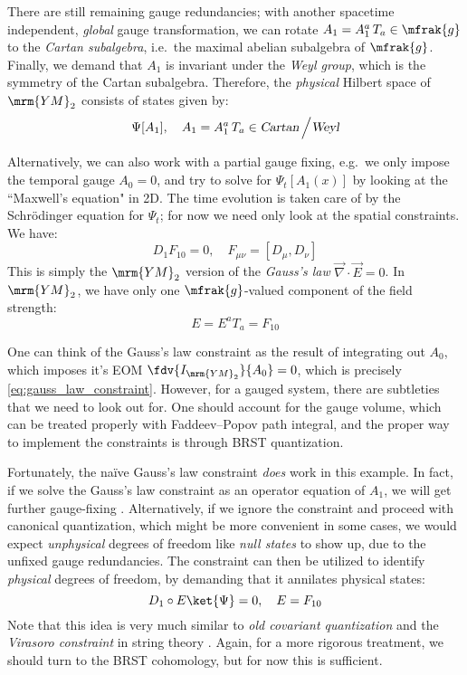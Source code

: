 \documentclass[a4paper
	,10pt
]{article}
\newcommand{\YM}{{\ensuremath{\mrm{YM}_2}}\xspace}
\begin{document}
	There are still remaining gauge redundancies; with another spacetime independent, \textit{global} gauge transformation, we can rotate $
		A_1 = A_1^a\,T_a \in \mfrak{g}
	$ to the \textit{Cartan subalgebra}, i.e.~the maximal abelian subalgebra of $\mfrak{g}$. Finally, we demand that $A_1$ is invariant under the \textit{Weyl group}, which is the symmetry of the Cartan subalgebra. Therefore, the \textit{physical} Hilbert space of \YM consists of states given by:
	\begin{equation}
		\Psi[A_1],\quad
		A_1
		= A_1^a\,T_a
		\in \textsl{Cartan} \,\Big/ \textsl{Weyl}
	\label{eq:hilbert_space}
	\end{equation}
	
	Alternatively, we can also work with a partial gauge fixing, e.g.~we only impose the temporal gauge $A_0 = 0$, and try to solve for $\Psi_t[A_1(x)]$ by looking at the ``Maxwell's equation" in 2D. The time evolution is taken care of by the Schr\"odinger equation for $\Psi_t$; for now we need only look at the spatial constraints. We have:
	\begin{equation}
		D_1 F_{10} = 0,
	\quad
		F_{\mu\nu} = [D_\mu,D_\nu]
	\label{eq:gauss_law_constraint}
	\end{equation}
	This is simply the \YM version of the \textit{Gauss's law} $\vec{\nabla}\cdot\vec{E} = 0$. In \YM, we have only one $\mfrak{g}$-valued component of the field strength:
	\begin{equation}
		E = E^a T_a = F_{10}
	\end{equation} 
	
	One can think of the Gauss's law constraint as the result of integrating out $A_0$, which imposes it's EOM $\fdv{I_\YM}{A_0} = 0$, which is precisely \eqref{eq:gauss_law_constraint}. 
	However, for a gauged system, there are subtleties that we need to look out for. One should account for the gauge volume, which can be treated properly with Faddeev--Popov path integral, and the proper way to implement the constraints is through BRST quantization. 
	
	Fortunately, the na\"ive Gauss's law constraint \textit{does} work in this example. In fact, if we solve the Gauss's law constraint as an operator equation of $A_1$, we will get further gauge-fixing \cite{Hatfield:234595}. 
	Alternatively, if we ignore the constraint and proceed with canonical quantization, which might be more convenient in some cases, we would expect \textit{unphysical} degrees of freedom like \textit{null states} to show up, due to the unfixed gauge redundancies. The constraint can then be utilized to identify \textit{physical} degrees of freedom, by demanding that it annilates physical states:
	\begin{equation}
		D_1 \circ E \ket{\Psi} = 0,
	\quad E = F_{10}
	\label{eq:gauss_law_constraint_state}
	\end{equation}
	Note that this idea is very much similar to \textit{old covariant quantization} and the \textit{Virasoro constraint} in string theory \cite{Polchinski:1998rq}. Again, for a more rigorous treatment, we should turn to the BRST cohomology, but for now this is sufficient. 
	
\end{document}
